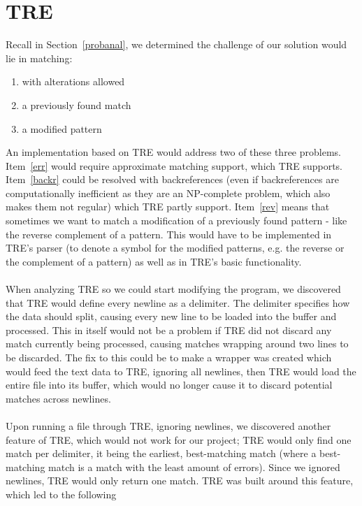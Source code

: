 \section{TRE}\label{tre}
Recall in Section~\ref{probanal}, we determined the challenge of our 
solution would lie in matching:
\begin{enumerate}
\item \label{err} with alterations allowed
\item \label{backr} a previously found match 
\item \label{rev} a modified pattern
\end{enumerate}
An implementation based on TRE would address two of these three 
problems. Item~\ref{err} would require approximate matching support, which 
TRE supports. Item~\ref{backr} could be resolved 
with backreferences (even if backreferences are computationally inefficient as 
they are an NP-complete problem, which also makes them not regular) 
which TRE partly support. Item~\ref{rev} means that sometimes we want to 
match a modification of a previously found pattern - like the reverse 
complement of a pattern. This would have to be implemented in TRE's parser 
(to denote a symbol for the modified patterns, e.g. the reverse or the 
complement of a pattern) as 
well as in TRE's basic functionality.\\\\
When analyzing TRE so we could start modifying the 
program, we discovered that TRE would define every newline as a delimiter. The 
delimiter specifies how the data should split, causing every new line 
to be loaded into the buffer and processed. This in 
itself would not be a problem if TRE did not discard any match currently being 
processed, causing matches wrapping around two 
lines to be discarded. The fix to this could be to make a wrapper 
was created which would feed the text data to TRE, 
ignoring all newlines, then TRE would load the entire file into its buffer, 
which would no longer cause it to discard potential matches across newlines.\\\\
Upon running a file through TRE, ignoring newlines, we discovered 
another feature of TRE, which would not work for our project; TRE would only 
find one match per delimiter, it being the earliest, best-matching match (where a 
best-matching match is a match with the least amount of errors). Since we ignored 
newlines, TRE would only 
return one match. TRE was built around this feature, which led to the following 
